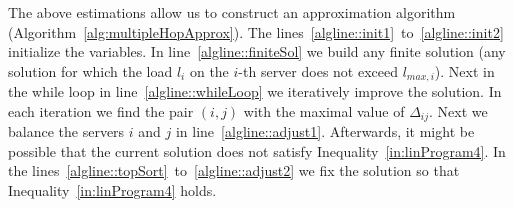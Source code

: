 \documentclass[11pt]{article}
\newcommand{\lmaxi}{{{l_{\mathit{max}, i}}}}
\begin{document}
The above estimations allow us to construct an approximation algorithm (Algorithm~\ref{alg:multipleHopApprox}). The lines~\ref{algline::init1}~to~\ref{algline::init2} initialize the variables. In line~\ref{algline::finiteSol} we build any finite solution (any solution for which the load $l_i$ on the $i$-th server does not exceed $\lmaxi$). Next in the while loop in line~\ref{algline::whileLoop} we iteratively improve the solution. In each iteration we find the pair $(i, j)$ with the maximal value of $\Delta_{ij}$. Next we balance the servers $i$ and $j$ in line~\ref{algline::adjust1}. Afterwards, it might be possible that the current solution does not satisfy Inequality~\ref{in:linProgram4}. In the lines~\ref{algline::topSort}~to~\ref{algline::adjust2} we fix the solution so that Inequality~\ref{in:linProgram4} holds.
\end{document}
